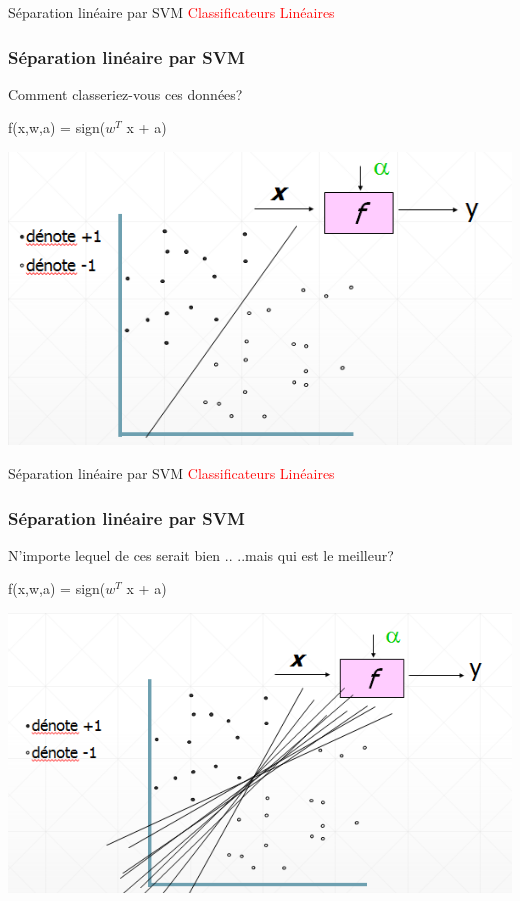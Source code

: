 \documentclass{bredelebeamer}
\begin{document}
\begin{frame}{Séparation linéaire par SVM}
\textcolor{red}{Classificateurs Linéaires}
 
    \frametitle{Séparation linéaire par SVM }
    \begin{minipage}{0.3\textwidth}
        Comment classeriez-vous ces données?\vspace{2\baselineskip}
        
        
        f(x,w,a) = sign($w^{T}$ x + a)
    \end{minipage}
    \begin{minipage}{0.3\textwidth}
        \includegraphics[scale=0.55]{7.png}
    \end{minipage}
\end{frame}

\begin{frame}{Séparation linéaire par SVM}
\textcolor{red}{Classificateurs Linéaires}
 
    \frametitle{Séparation linéaire par SVM}
    \begin{minipage}{0.3\textwidth}
     N'importe lequel de ces serait bien ..
..mais qui est le meilleur?
\vspace{2\baselineskip}
        
        
        f(x,w,a) = sign($w^{T}$ x + a)
    \end{minipage}
    \begin{minipage}{0.3\textwidth}
        \includegraphics[scale=0.55]{8.png}
    \end{minipage}
\end{frame}
\end{document}
